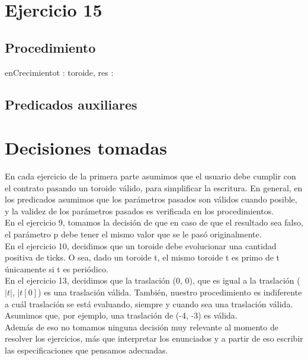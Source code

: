 \documentclass[a4paper]{article}
\begin{document}

\section{Ejercicio 15}

\subsection{Procedimiento}
\begin{proc}{enCrecimiento}{\In t : toroide, \Out res : \bool}{}
\end{proc}

\subsection{Predicados auxiliares}

    
\section{Decisiones tomadas}
En cada ejercicio de la primera parte asumimos que el usuario debe cumplir con el contrato pasando un toroide válido, para simplificar la escritura.
 En general, en los predicados asumimos que los parámetros pasados son válidos cuando posible, y la validez de los parámetros pasados es verificada en los procedimientos.\\ 
\indent En el ejercicio 9, tomamos la decisión de que en caso de que el resultado sea falso, el parámetro p debe tener el mismo valor que se le pasó originalmente. \\
\indent En el ejercicio 10, decidimos que un toroide debe evolucionar una cantidad positiva de ticks. O sea, dado un toroide t, el mismo toroide t 
es primo de t únicamente si t es periódico. \\
\indent En el ejercicio 13, decidimos que la traslación (0, 0), que es igual a la traslación
($|t|$, $|t[0]$) es una traslación válida. 
También, nuestro procedimiento es indiferente a cuál traslación se está evaluando, siempre y cuando sea una traslación válida. 
Asumimos que, por ejemplo, una traslación de (-4, -3) es válida.\\
\indent Además de eso no tomamos ninguna decisión muy relevante al momento de resolver los ejercicios, más que interpretar los enunciados y a partir de eso escribir las especificaciones que pensamos adecuadas.
\end{document}
